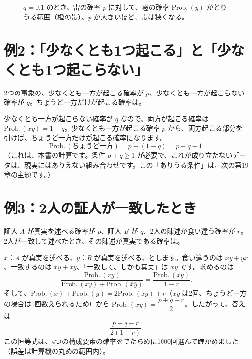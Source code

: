 \documentclass[a4paper,11pt,openany]{ltjsbook}
\newcommand{\nx}[1]{\overline{#1}}
\newcommand{\Prob}{\mathrm{Prob.}\,}
\begin{document}
\begin{figure}[htbp]
\centering
{}
\caption{$q=0.1$ のとき、雷の確率 $p$ に対して、雹の確率 $\Prob(y)$ がとりうる範囲（橙の帯）。$p$ が大きいほど、帯は狭くなる。}
\end{figure}

\section{例2：「少なくとも1つ起こる」と「少なくとも1つ起こらない」}

2つの事象の、少なくとも一方が起こる確率が $p$、少なくとも一方が起こらない確率が $q$。ちょうど一方だけが起こる確率は。

少なくとも一方が起こらない確率が $q$ なので、両方が起こる確率は $\Prob(xy)=1-q$。少なくとも一方が起こる確率 $p$ から、両方起こる部分を引けば、ちょうど一方だけが起こる確率になります。
\[
\Prob(\text{ちょうど一方})=p-(1-q)=p+q-1 .
\]
（これは、本書の計算です。条件 $p+q\ge1$ が必要で、これが成り立たないデータは、現実にはありえない組み合わせです。この「ありうる条件」は、次の第19章の主題です。）

\section{例3：2人の証人が一致したとき}

証人 $A$ が真実を述べる確率が $p$、証人 $B$ が $q$、2人の陳述が食い違う確率が $r$。2人が一致して述べたとき、その陳述が真実である確率は。

$x$：$A$ が真実を述べる、$y$：$B$ が真実を述べる、とします。食い違うのは $x\nx y+y\nx x$、一致するのは $xy+\nx x\nx y$、「一致して、しかも真実」は $xy$ です。求めるのは
\[
\frac{\Prob(xy)}{\Prob(xy)+\Prob(\nx x\nx y)}=\frac{\Prob(xy)}{1-r}.
\]
そして、$\Prob(x)+\Prob(y)=2\Prob(xy)+r$（$xy$ は2回、ちょうど一方の場合は1回数えられるため）から $\Prob(xy)=\dfrac{p+q-r}{2}$。したがって、答えは
\[
\frac{p+q-r}{2(1-r)} .
\]
この恒等式は、4つの構成要素の確率をでたらめに1000回選んで確かめました（誤差は計算機の丸めの範囲内）。
\end{document}
